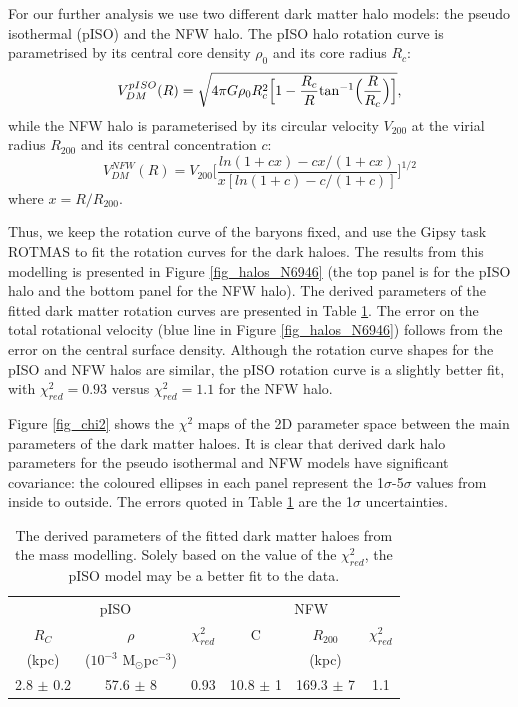 \documentclass[fleqn,usenatbib]{mnras}
\begin{document}
For our further analysis we use two different %
dark matter halo models: the pseudo isothermal (pISO) and the NFW halo. 
The pISO halo rotation curve is parametrised by its central core density $\rho_{0}$ and %
its core radius $R_{c}$:
 \begin{equation}
V_{DM}^{pISO} (R)=\sqrt{4\pi G \rho_{0}R^{2}_c \Big[1-\frac{R_c}{R} {\rm tan}^{-1}\Big(\frac{R}{R_c}\Big)\Big]},
\end{equation}
while the NFW halo \citep{navarro97} is parameterised by its %
circular velocity $V_{200}$ at the %
virial radius $R_{200}$ and its central concentration $c$:
\begin{equation}
V_{DM}^{NFW} (R)=V_{200}\bigg[\frac{ln(1+cx)-cx/(1+cx)}{x[ln(1+c)-c/(1+c)]}\bigg]^{1/2}
\end{equation}
where $x=R/R_{200}$. %

Thus, we keep the rotation curve of the baryons fixed, and use %
the Gipsy \citep{gipsy} task ROTMAS to fit the rotation curves for the dark haloes. The results from this modelling is presented in Figure \ref{fig_halos_N6946} (the top panel is for the pISO halo and the bottom panel for the NFW halo). The derived parameters of the fitted dark matter rotation curves are presented in Table \ref{tbl_halos_N6946}. The error on the total rotational velocity (blue line in Figure \ref{fig_halos_N6946}) follows from the error on the central surface density.
Although the rotation curve shapes for the pISO and NFW halos are similar, the pISO %
rotation curve is a slightly better fit, with $\chi_{red}^{2}=0.93$ versus $\chi_{red}^{2}=1.1$ for the NFW halo. 

Figure \ref{fig_chi2} shows the $\chi^2$ maps of the 2D parameter space between the main parameters of the dark matter haloes. It is clear that derived dark halo parameters for the pseudo isothermal and NFW models have significant covariance: the coloured ellipses in each panel represent the 1$\sigma$-5$\sigma$  values from inside to outside. The errors quoted in Table \ref{tbl_halos_N6946} are the 1$\sigma$ uncertainties.

\begin{table} %
\begin{tabular}{cccccc}
\hline
\multicolumn{3}{c}{pISO}&\multicolumn{3}{c}{NFW}\\
$R_{C}$&$\rho$&$\chi_{red}^{2}$&C&$R_{200}$&$\chi_{red}^{2}$\\
(kpc) & ($10^{-3}$ M$_\odot$pc$^{-3}$) & & &(kpc) & \\
\hline
 2.8 $\pm$ 0.2&57.6 $\pm$ 8&0.93&10.8 $\pm$ 1&169.3 $\pm$ 7&1.1\\
\hline
\end{tabular}
\caption[Derived dark halo parameters from mass modelling in NGC 6946.]{The derived parameters of the fitted dark matter haloes from the mass modelling. Solely based on the value of the $\chi^2_{red}$, the pISO model may be a better fit to the data.
}
\label{tbl_halos_N6946}
\end{table}
\end{document}

